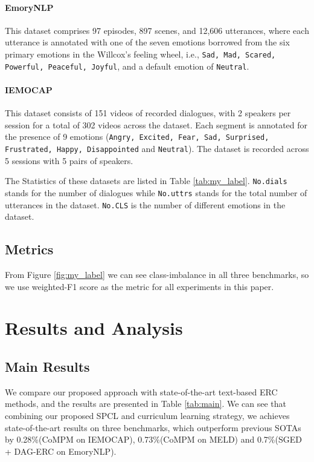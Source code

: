 \documentclass[11pt]{article}
\begin{document}
\paragraph{EmoryNLP} This dataset comprises 97 episodes, 897 scenes, and 12,606 utterances, where each utterance is annotated with one of the seven emotions borrowed from the six primary emotions in the Willcox’s feeling wheel\cite{willcox1982feeling}, i.e., \texttt{Sad, Mad, Scared, Powerful, Peaceful, Joyful}, and a default emotion of \texttt{Neutral}.



\paragraph{IEMOCAP} This dataset consists of 151 videos of recorded dialogues, with 2 speakers per session for a total of 302 videos across the dataset. Each segment is annotated for the presence of 9 emotions (\texttt{Angry, Excited, Fear, Sad, Surprised, Frustrated, Happy, Disappointed} and \texttt{Neutral}). The dataset is recorded across 5 sessions with 5 pairs of speakers.


The Statistics of these datasets are listed in Table \ref{tab:my_label}. \texttt{No.dials} stands for the number of dialogues while \texttt{No.uttrs} stands for the total number of utterances in the dataset. \texttt{No.CLS} is the number of different emotions in the dataset.
\subsection{Metrics}
From Figure \ref{fig:my_label} we can see class-imbalance in all three benchmarks, so we use weighted-F1 score as the metric for all experiments in this paper.



\section{Results and Analysis}

\subsection{Main Results}

We compare our proposed approach with state-of-the-art text-based ERC methods, and the results are presented in Table \ref{tab:main}. We can see that combining our proposed SPCL and curriculum learning strategy, we achieves state-of-the-art results on three benchmarks, which outperform previous SOTAs by 0.28\%(CoMPM on IEMOCAP), 0.73\%(CoMPM on MELD) and 0.7\%(SGED + DAG-ERC on EmoryNLP).
\end{document}

